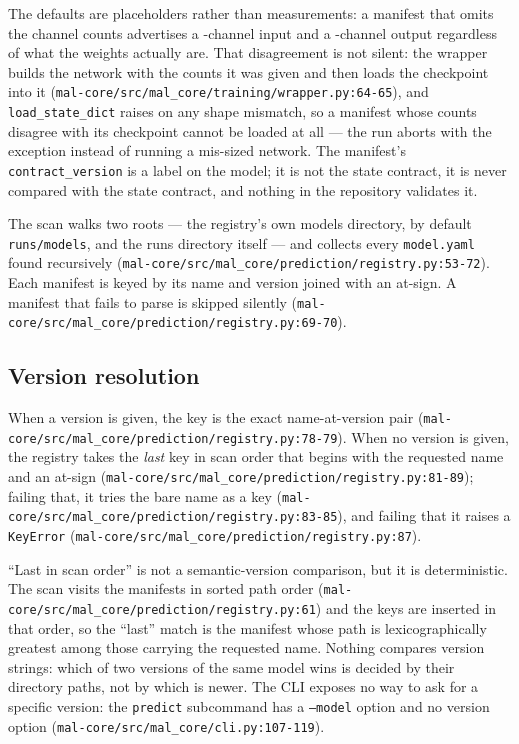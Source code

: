 \documentclass[11pt,a4paper]{article}
\newcommand{\code}[1]{\texttt{#1}}
\begin{document}
The defaults are placeholders rather than measurements: a manifest that omits
the channel counts advertises a -channel
input and a -channel output
regardless of what the weights actually are. That disagreement is not
silent: the wrapper builds the network with the counts it was given and then
loads the checkpoint into it
(\code{mal-core/src/mal\_core/training/wrapper.py:64-65}), and
\code{load\_state\_dict} raises on any shape mismatch, so a manifest whose
counts disagree with its checkpoint cannot be loaded at all --- the run
aborts with the exception instead of running a mis-sized network. The
manifest's
\code{contract\_version} is a label on the model; it is not the state
contract, it is never compared with the state contract, and nothing in the
repository validates it.

The scan walks two roots --- the registry's own models directory, by default
\code{runs/models}, and the runs directory itself --- and collects every
\code{model.yaml} found recursively
(\code{mal-core/src/mal\_core/prediction/registry.py:53-72}). Each manifest
is keyed by its name and version joined with an at-sign. A manifest that
fails to parse is skipped silently
(\code{mal-core/src/mal\_core/prediction/registry.py:69-70}).

\subsection{Version resolution}

When a version is given, the key is the exact name-at-version pair
(\code{mal-core/src/mal\_core/prediction/registry.py:78-79}). When no version
is given, the registry takes the \emph{last} key in scan order that begins
with the requested name and an at-sign
(\code{mal-core/src/mal\_core/prediction/registry.py:81-89}); failing that, it
tries the bare name as a key
(\code{mal-core/src/mal\_core/prediction/registry.py:83-85}), and failing
that it raises a \code{KeyError}
(\code{mal-core/src/mal\_core/prediction/registry.py:87}).

``Last in scan order'' is not a semantic-version comparison, but it is
deterministic. The scan visits the manifests in sorted path order
(\code{mal-core/src/mal\_core/prediction/registry.py:61}) and the keys are
inserted in that order, so the ``last'' match is the manifest whose path is
lexicographically greatest among those carrying the requested name. Nothing
compares version strings: which of two versions of the same model wins is
decided by their directory paths, not by which is newer. The
CLI exposes no way to ask for a specific version: the \code{predict}
subcommand has a \code{--model} option and no version option
(\code{mal-core/src/mal\_core/cli.py:107-119}).
\end{document}
